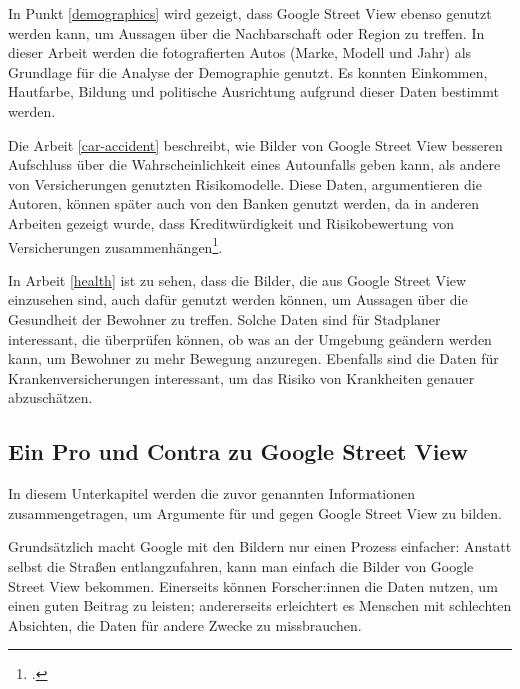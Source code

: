 In Punkt \ref{demographics} wird gezeigt, dass Google Street View ebenso genutzt
werden kann, um Aussagen über die Nachbarschaft oder Region zu treffen. In
dieser Arbeit werden die fotografierten Autos (Marke, Modell und Jahr) als
Grundlage für die Analyse der Demographie genutzt. Es konnten Einkommen,
Hautfarbe, Bildung und politische Ausrichtung aufgrund dieser Daten bestimmt
werden.

Die Arbeit \ref{car-accident} beschreibt, wie Bilder von Google Street View
besseren Aufschluss über die Wahrscheinlichkeit eines Autounfalls geben kann,
als andere von Versicherungen genutzten Risikomodelle. Diese Daten,
argumentieren die Autoren, können später auch von den Banken genutzt werden, da
in anderen Arbeiten gezeigt wurde, dass Kreditwürdigkeit und Risikobewertung von
Versicherungen zusammenhängen\footcite{doi:10.1080/10920277.2016.1209118}.

In Arbeit \ref{health} ist zu sehen, dass die Bilder, die aus Google Street View
einzusehen sind, auch dafür genutzt werden können, um Aussagen über die
Gesundheit der Bewohner zu treffen. Solche Daten sind für Stadplaner
interessant, die überprüfen können, ob was an der Umgebung geändern werden kann,
um Bewohner zu mehr Bewegung anzuregen. Ebenfalls sind die Daten für
Krankenversicherungen interessant, um das Risiko von Krankheiten genauer
abzuschätzen.

\subsection{Ein Pro und Contra zu Google Street View}

In diesem Unterkapitel werden die zuvor genannten Informationen
zusammengetragen, um Argumente für und gegen Google Street View zu bilden.

Grundsätzlich macht Google mit den Bildern nur einen Prozess einfacher: Anstatt
selbst die Straßen entlangzufahren, kann man einfach die Bilder von Google
Street View bekommen. Einerseits können Forscher:innen die Daten nutzen, um
einen guten Beitrag zu leisten; andererseits erleichtert es Menschen mit
schlechten Absichten, die Daten für andere Zwecke zu missbrauchen.



